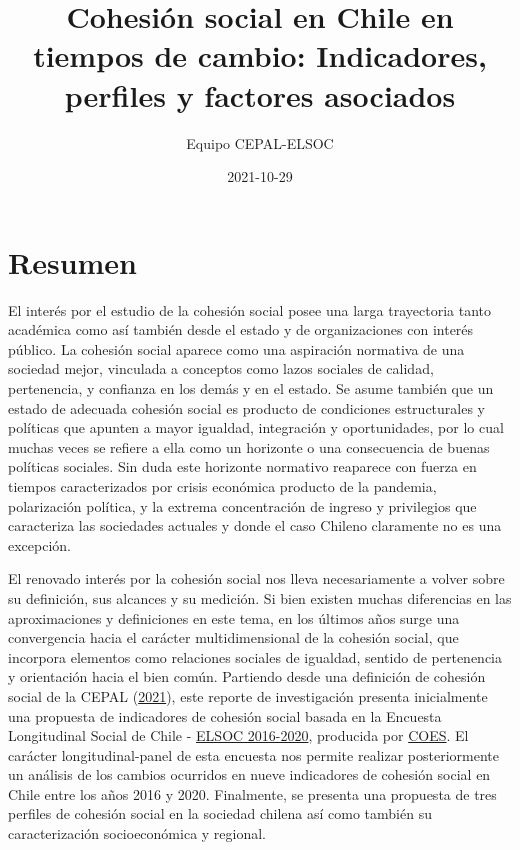 \documentclass[
  12pt,
]{book}
\title{Cohesión social en Chile en tiempos de cambio: Indicadores, perfiles y factores asociados}
\author{Equipo CEPAL-ELSOC}
\date{2021-10-29}
\begin{document}
\maketitle

{
\hypersetup{linkcolor=}
\setcounter{tocdepth}{1}
\tableofcontents
}
\listoftables
\listoffigures
{}
\hypertarget{resumen}{%
\chapter*{Resumen}\label{resumen}}

El interés por el estudio de la cohesión social posee una larga trayectoria tanto académica como así también desde el estado y de organizaciones con interés público. La cohesión social aparece como una aspiración normativa de una sociedad mejor, vinculada a conceptos como lazos sociales de calidad, pertenencia, y confianza en los demás y en el estado. Se asume también que un estado de adecuada cohesión social es producto de condiciones estructurales y políticas que apunten a mayor igualdad, integración y oportunidades, por lo cual muchas veces se refiere a ella como un horizonte o una consecuencia de buenas políticas sociales. Sin duda este horizonte normativo reaparece con fuerza en tiempos caracterizados por crisis económica producto de la pandemia, polarización política, y la extrema concentración de ingreso y privilegios que caracteriza las sociedades actuales y donde el caso Chileno claramente no es una excepción.

El renovado interés por la cohesión social nos lleva necesariamente a volver sobre su definición, sus alcances y su medición. Si bien existen muchas diferencias en las aproximaciones y definiciones en este tema, en los últimos años surge una convergencia hacia el carácter multidimensional de la cohesión social, que incorpora elementos como relaciones sociales de igualdad, sentido de pertenencia y orientación hacia el bien común. Partiendo desde una definición de cohesión social de la CEPAL (\protect\hyperlink{ref-cepal_cohesion_2021}{2021}), este reporte de investigación presenta inicialmente una propuesta de indicadores de cohesión social basada en la Encuesta Longitudinal Social de Chile - \href{https://coes.cl/encuesta-panel/}{ELSOC 2016-2020}, producida por \href{https://coes.cl/}{COES}. El carácter longitudinal-panel de esta encuesta nos permite realizar posteriormente un análisis de los cambios ocurridos en nueve indicadores de cohesión social en Chile entre los años 2016 y 2020. Finalmente, se presenta una propuesta de tres perfiles de cohesión social en la sociedad chilena así como también su caracterización socioeconómica y regional.
\end{document}
